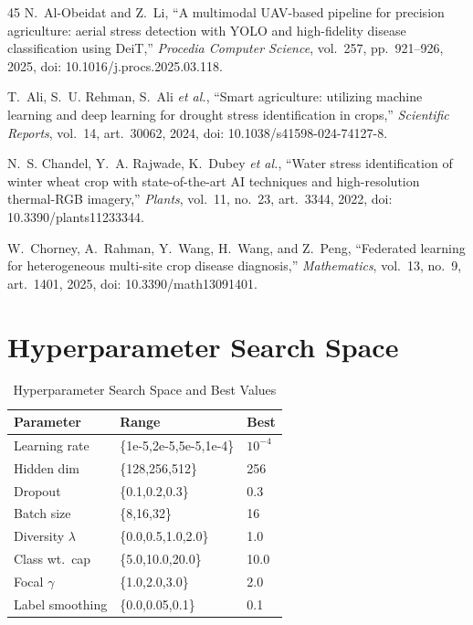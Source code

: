 \documentclass[conference]{IEEEtran}
\begin{document}
\begin{thebibliography}{45}
N.~Al-Obeidat and Z.~Li,
``A multimodal {UAV}-based pipeline for precision agriculture: aerial stress
detection with {YOLO} and high-fidelity disease classification using {DeiT},''
\emph{Procedia Computer Science}, vol.~257, pp.\ 921--926, 2025,
doi: 10.1016/j.procs.2025.03.118.

T.~Ali, S.~U. Rehman, S.~Ali \emph{et al.},
``Smart agriculture: utilizing machine learning and deep learning for drought
stress identification in crops,''
\emph{Scientific Reports}, vol.~14, art.\ 30062, 2024,
doi: 10.1038/s41598-024-74127-8.

N.~S. Chandel, Y.~A. Rajwade, K.~Dubey \emph{et al.},
``Water stress identification of winter wheat crop with state-of-the-art
{AI} techniques and high-resolution thermal-{RGB} imagery,''
\emph{Plants}, vol.~11, no.~23, art.\ 3344, 2022,
doi: 10.3390/plants11233344.

W.~Chorney, A.~Rahman, Y.~Wang, H.~Wang, and Z.~Peng,
``Federated learning for heterogeneous multi-site crop disease diagnosis,''
\emph{Mathematics}, vol.~13, no.~9, art.\ 1401, 2025,
doi: 10.3390/math13091401.

\end{thebibliography}

\clearpage
\appendix

\section{Hyperparameter Search Space}
\begin{table}[!h]
\caption{Hyperparameter Search Space and Best Values}
\label{tab:hparam}
\centering\footnotesize
\begin{tabular}{lll}
\toprule
\textbf{Parameter} & \textbf{Range} & \textbf{Best}\\
\midrule
Learning rate    & \{1e-5,2e-5,5e-5,1e-4\} & $10^{-4}$ \\
Hidden dim       & \{128,256,512\}           & 256 \\
Dropout          & \{0.1,0.2,0.3\}           & 0.3 \\
Batch size       & \{8,16,32\}               & 16 \\
Diversity $\lambda$ & \{0.0,0.5,1.0,2.0\}   & 1.0 \\
Class wt.\ cap  & \{5.0,10.0,20.0\}         & 10.0 \\
Focal $\gamma$   & \{1.0,2.0,3.0\}           & 2.0 \\
Label smoothing  & \{0.0,0.05,0.1\}          & 0.1 \\
\bottomrule
\end{tabular}
\end{table}
\end{document}
